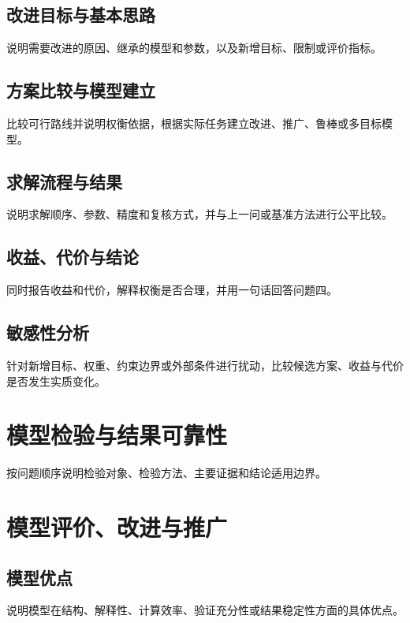 \documentclass[UTF8,a4paper,12pt]{ctexart}
\newif\ifshowguide
\newcommand{\WriteGuide}[3]{%
  \ifshowguide
  \begin{quote}
    \small
    \textbf{写什么：}#1\par
    \textbf{怎么写：}#2\par
    \textbf{避免：}#3
  \end{quote}
  \fi
}
\begin{document}
\subsection{改进目标与基本思路}
说明需要改进的原因、继承的模型和参数，以及新增目标、限制或评价指标。

\subsection{方案比较与模型建立}
比较可行路线并说明权衡依据，根据实际任务建立改进、推广、鲁棒或多目标模型。

\subsection{求解流程与结果}
说明求解顺序、参数、精度和复核方式，并与上一问或基准方法进行公平比较。

\subsection{收益、代价与结论}
同时报告收益和代价，解释权衡是否合理，并用一句话回答问题四。

\subsection{敏感性分析}
针对新增目标、权重、约束边界或外部条件进行扰动，比较候选方案、收益与代价是否发生实质变化。

\section{模型检验与结果可靠性}

\WriteGuide
  {按问题说明方法为何适配、结果如何验证、是否存在独立证据以及可信边界。}
  {根据题型选择误差指标、留出法、交叉验证、残差检验、基准方法、约束复核或独立方法交叉印证。}
  {训练与验证使用同一数据却声称具有泛化能力；只报告单一指标；把相关性写成因果关系。}

按问题顺序说明检验对象、检验方法、主要证据和结论适用边界。

\section{模型评价、改进与推广}

\subsection{模型优点}
说明模型在结构、解释性、计算效率、验证充分性或结果稳定性方面的具体优点。
\end{document}
